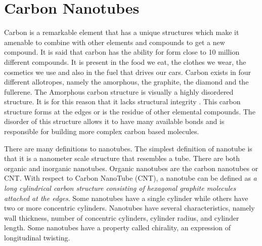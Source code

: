 \section {Carbon Nanotubes}
Carbon is a remarkable element that has a unique structures which make it amenable
to combine with other elements and compounds to get a new compound. It is said
that carbon has the ability for form close to 10 million different compounds. It is
present in the food we eat, the clothes we wear, the cosmetics we use and also in
the fuel that drives our cars. Carbon exists in four different allotropes, namely the
amorphous, the graphite, the diamond and the fullerene. The Amorphous carbon
structure is visually a highly disordered structure. It is for this reason that it lacks
structural integrity . This carbon structure forms at the edges or is the residue of other
elemental compounds. The disorder of this structure allows it to have many available
bonds and is responsible for building more complex carbon based molecules.

There are many definitions to nanotubes. The simplest definition of nanotube is that
it is a nanometer scale structure that resembles a tube. There are both organic and
inorganic nanotubes. Organic nanotubes are the carbon nanotubes or CNT. With
respect to Carbon NanoTube (CNT), a nanotube can be defined as \emph{a long cylindrical carbon structure
consisting of hexagonal graphite molecules attached at the edges}. Some nanotubes
have a single cylinder while others have two or more concentric cylinders. Nanotubes
have several characteristics, namely wall thickness, number of concentric cylinders,
cylinder radius, and cylinder length. Some nanotubes have a property called chirality,
an expression of longitudinal twisting.

